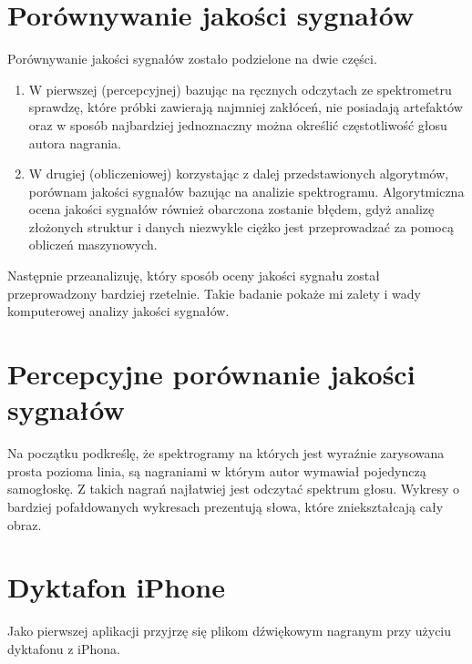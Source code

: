 \documentclass[a4paper,12pt]{extarticle}
\begin{document}
\section*{Porównywanie jakości sygnałów}

Porównywanie jakości sygnałów zostało podzielone na dwie części.

\begin{enumerate}
    \item W pierwszej (percepcyjnej) bazując na ręcznych odczytach ze spektrometru sprawdzę, które próbki zawierają najmniej zakłóceń, nie posiadają artefaktów oraz w sposób najbardziej jednoznaczny można określić częstotliwość głosu autora nagrania.

    \item W drugiej (obliczeniowej) korzystając z dalej przedstawionych algorytmów, porównam jakości sygnałów bazując na analizie spektrogramu. Algorytmiczna ocena jakości sygnałów również obarczona zostanie błędem, gdyż analizę złożonych struktur i danych niezwykle ciężko jest przeprowadzać za pomocą obliczeń maszynowych.
\end{enumerate}

Następnie przeanalizuję, który sposób oceny jakości sygnału został przeprowadzony bardziej rzetelnie. Takie badanie pokaże mi zalety i wady komputerowej analizy jakości sygnałów.

\section*{Percepcyjne porównanie jakości sygnałów}

Na początku podkreślę, że spektrogramy na których jest wyraźnie zarysowana prosta pozioma linia, są nagraniami w którym autor wymawiał pojedynczą samogłoskę. Z takich nagrań najłatwiej jest odczytać spektrum głosu. Wykresy o bardziej pofałdowanych wykresach prezentują słowa, które zniekształcają cały obraz.

\section*{Dyktafon iPhone}

Jako pierwszej aplikacji przyjrzę się plikom dźwiękowym nagranym przy użyciu dyktafonu z iPhona.
\end{document}
